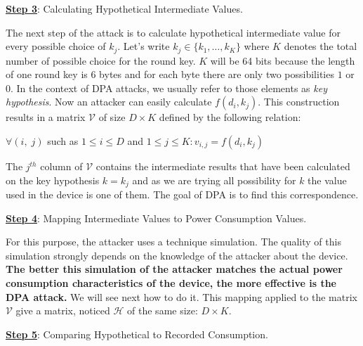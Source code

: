 \newpage
\underline{\textbf{Step 3}}: Calculating Hypothetical Intermediate Values.

The next step of the attack is to calculate hypothetical intermediate value for every possible 
choice of $k_j$. Let's write $k_j  \in \{ k_1, \ldots, k_K \} $ where $K$ denotes the total number
of possible choice for the round key. $K$ will be 64 bits because the length of one round key is 6
bytes and for each byte there are only two possibilities $1$ or $0$. In the context of DPA
attacks, we usually refer to those elements as \textit{key hypothesis}.
Now an attacker can easily calculate $f(d_i,k_j)$.
This construction results in a matrix $\mathcal{V}$ of size $D \times K$ defined by the
following relation:
\begin{center}
$\forall (i,\;j)$ such as $1\leq i \leq D$ and $1 \leq j \leq K: v_{i,j}= f(d_i,k_j)$
\end{center}

The $j^{th}$ column of $\mathcal{V}$ contains the intermediate results that have been calculated on the key
hypothesis $k=k_j$ and as we are trying all possibility for $k$ the value used in the device is one of them.
The goal of DPA is to find this correspondence.
\vspace{3mm}

\underline{\textbf{Step 4}}: Mapping Intermediate Values to Power Consumption Values.

For this purpose, the attacker uses a technique simulation. 
The quality of this simulation strongly depends
on the knowledge of the attacker about the device. \textbf{The better this simulation 
of the attacker matches the
actual power consumption characteristics of the device, the more effective is the DPA attack.} 
We will see next how to do it. This mapping applied to the matrix 
$\mathcal{V}$ give a matrix, noticed $\mathcal{H}$ 
of the same size: $D \times K$.
\vspace{3mm}

\underline{\textbf{Step 5}}: Comparing Hypothetical to Recorded Consumption. 

